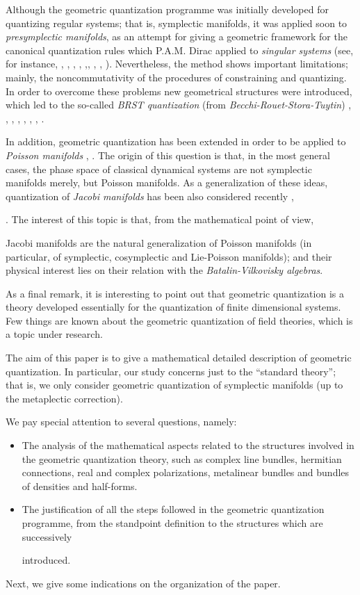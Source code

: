 \documentclass[12pt]{article}
\begin{document}
Although the geometric quantization programme was initially developed
for quantizing regular systems; that is, symplectic manifolds,
it was applied soon to {\it presymplectic manifolds},
as an attempt for giving a geometric framework for the canonical
quantization
rules which P.A.M. Dirac applied to {\it singular systems}
(see, for instance,  \cite{AS-86}, \cite{Blau-88a}, \cite{Blau-88b},
\cite{Go-86},
\cite{GS-81},\cite{Lo-90}, \cite{Ml-89}, \cite{Sn-83}, \cite{Tu-91}).
Nevertheless, the method shows important limitations;
mainly, the noncommutativity of the procedures of constraining
and quantizing. In order to overcome these problems
new geometrical structures were introduced, which led to the so-called
{\it BRST quantization} (from {\it Becchi-Rouet-Stora-Tuytin})
\cite{ALN-90}, \cite{ALN-91}, \cite{DEGST-91}, \cite{Ib-90},
\cite{Ko-77}, \cite{Lo-92},
\cite{Tu-92a}, \cite{Tu-92b}.

In addition, geometric quantization has been extended in order to be
applied to
{\it Poisson manifolds} \cite{Va-91}, \cite{Va-97}.
The origin of this question is that, in the most general cases,
the phase space of classical dynamical systems are not symplectic
manifolds merely,
but Poisson manifolds. As a generalization of these ideas, quantization
of
{\it Jacobi manifolds}  has been also considered recently \cite{CLM-96},

\cite{LMP-97}.
The interest of this topic is that, from the mathematical point of view,

Jacobi manifolds are the natural generalization of Poisson manifolds
(in particular, of symplectic, cosymplectic and Lie-Poisson manifolds);
and their physical interest lies on their relation with the
{\it Batalin-Vilkovisky algebras}.

As a final remark, it is interesting to point out that
geometric quantization is a theory developed essentially
for the quantization of finite dimensional systems.
Few things are known about the geometric quantization of
field theories, which is a topic under research.

The aim of this paper is to give a mathematical detailed description of
geometric quantization. In particular, our study concerns
just to the ``standard theory''; that is, we only consider geometric
quantization
of symplectic manifolds (up to the metaplectic correction).

We pay special attention to several questions, namely:
\begin{itemize}
\item
The analysis of the mathematical aspects related
to the structures involved in the geometric
quantization theory, such as complex line bundles, hermitian
connections,
real and complex polarizations, metalinear bundles and
bundles of densities and half-forms.
\item
The justification of all the steps followed in the geometric
quantization programme,
 from the standpoint definition to the structures which are successively

introduced.
\end{itemize}
Next, we give some indications on the organization of the paper.
\end{document}
